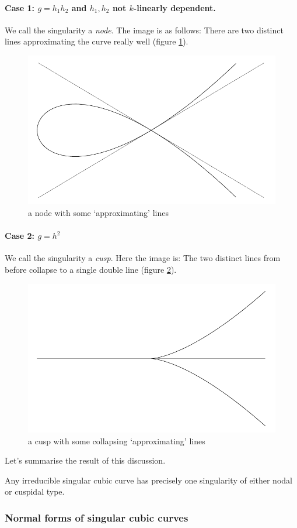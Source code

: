 \paragraph{Case 1: \textnormal{$g=h_1h_2$ and $h_1,h_2$ not $k$-linearly dependent.}}
We call the singularity a \emph{node}.
The image is as follows: There are two distinct lines approximating the curve really well (figure \ref{figureNode}).
\begin{figure}
\center
\includegraphics[width=.5\textwidth]{img/nodal.pdf}
\caption{a node with some `approximating' lines}
\label{figureNode}
\end{figure}



\paragraph{Case 2: $g=h^2$}
We call the singularity a \emph{cusp}.
Here the image is: The two distinct lines from before collapse to a single double line (figure \ref{figureCusp}).
\begin{figure}
\center
\includegraphics[width=.5\textwidth]{img/cuspidal.pdf}
\caption{a cusp with some collapsing `approximating' lines}
\label{figureCusp}
\end{figure}


Let's summarise the result of this discussion.

\begin{proposition} \label{propositionClassificationOfSingularCubics}
Any irreducible singular cubic curve has precisely one singularity of either nodal or cuspidal type.
\end{proposition}


\subsubsection{Normal forms of singular cubic curves}

